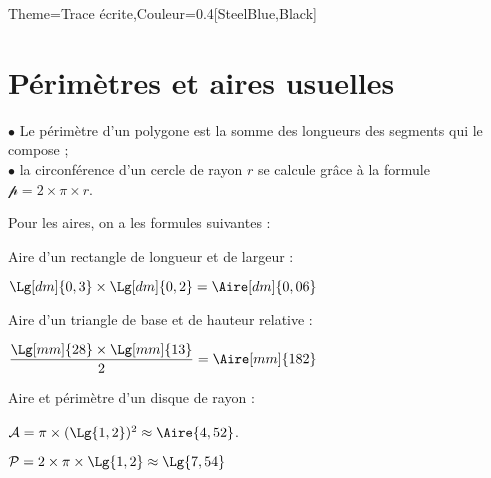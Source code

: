 \begin{Maquette}[Cours]{Theme={Trace écrite},Couleur={0.4[SteelBlue,Black]}}

   \section{Périmètres et aires usuelles}

      $\bullet$ Le périmètre d'un polygone est la somme des longueurs des segments qui le compose ; \\
      $\bullet$ la circonférence d'un cercle de rayon $r$ se calcule grâce à la formule $\mathcal{p} =2\times\pi\times r$. \medskip

      Pour les aires, on a les formules suivantes : \par
      \begin{minipage}[t]{5.5cm}
         \Formule[Aire,Surface=rectangle,Ancre={(2.5,-2)},Couleur=yellow!10]
      \end{minipage}
      \hfill
      \begin{minipage}[t]{6cm}
         \Formule[Aire,Surface=triangle,Ancre={(2.5,-2)},Couleur=yellow!10]
      \end{minipage}
      \hfill
      \begin{minipage}[t]{6cm}
         \Formule[Aire,Surface=disque,Ancre={(2.5,-2)},Couleur=yellow!10]
      \end{minipage}

      \vskip4cm

      \begin{minipage}[t]{5.5cm}
         \begin{exemple*}{}
            Aire d'un rectangle de longueur  et de largeur  : \par \smallskip
            $\Lg[dm]{0,3}\times\Lg[dm]{0,2} =\Aire[dm]{0,06}$
         \end{exemple*}
      \end{minipage}
      \hfill
      \begin{minipage}[t]{6cm}
         \begin{exemple*}{}
            Aire d'un triangle de base  et de hauteur relative  : \par \medskip
            $\dfrac{\Lg[mm]{28}\times\Lg[mm]{13}}{2} =\Aire[mm]{182}$
         \end{exemple*}
      \end{minipage}
      \hfill
      \begin{minipage}[t]{6cm}
         \begin{exemple*}{}
            Aire et périmètre d'un disque de rayon  : \par \smallskip
            $\mathcal{A} =\pi\times(\Lg{1,2})^2\approx\Aire{4,52}$. \par
            $\mathcal{P} =2\times\pi\times\Lg{1,2}\approx\Lg{7,54}$
         \end{exemple*}
      \end{minipage}


\end{Maquette}
